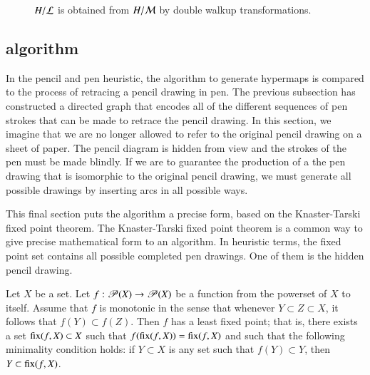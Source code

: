 \begin{figure}[htb]
\centering
{}
\caption{$H/{\cal L}$ is obtained from $H/{\cal M}$ by double walkup
transformations.}
\label{fig:L1L2dart}
\end{figure}



\subsection{algorithm}

In the pencil and pen heuristic, the algorithm to generate hypermaps
is compared to the process of retracing a pencil drawing in pen.  The
previous subsection has constructed a directed graph that encodes all
of the different sequences of pen strokes that can be made to retrace
the pencil drawing.  In this section, we imagine that we are no longer
allowed to refer to the original pencil drawing on a sheet of paper.
The pencil diagram is hidden from view and the strokes of the pen must
be made blindly.  If we are to guarantee the production of a the pen
drawing that is isomorphic to the original pencil drawing, we must
generate all possible drawings by inserting arcs in all possible ways.

This final section puts the algorithm a precise form, based on the
Knaster-Tarski fixed point theorem.  The Knaster-Tarski fixed point
theorem is a common way to give precise mathematical form to an
algorithm.  In heuristic terms, the fixed point set contains all
possible completed pen drawings.  One of them is the hidden
pencil drawing.

\begin{lemma}\cutrate{}   
Let $X$ be a set.  Let $f:{\mathscr P}(X)\to {\mathscr P}(X)$ be a
function from the powerset of $X$ to itself.  Assume that $f$ is
monotonic in the sense that whenever $Y\subset Z\subset X$, it
follows that $f(Y) \subset f(Z)$.  Then $f$ has a least fixed point; that is,
 there exists a set ${\operatorname{fix}}(f,X)\subset X$ such that
$f({\operatorname{fix}}(f,X)) = {\operatorname{fix}}(f,X)$ and such that the following
minimality condition holds: if $Y\subset X$ is any set such that
$f(Y) \subset Y$, then $Y\subset {\operatorname{fix}}(f,X)$.
\end{lemma}
%
%
%
%
%

